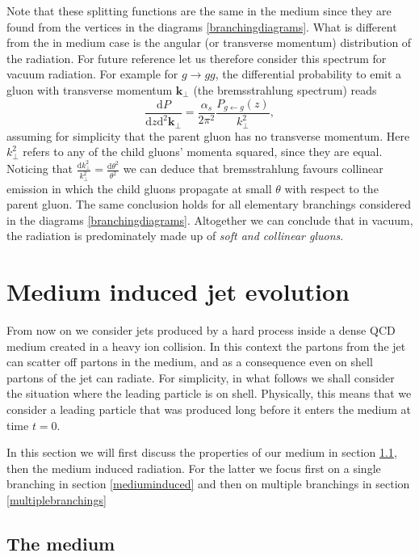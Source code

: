 \documentclass[a4paper,12pt]{article}
\numberwithin{equation}{section}
\begin{document}
Note that these splitting functions are the same in the medium since they are found from the vertices in the diagrams \eqref{branchingdiagrams}. What is different from the in medium case is the angular (or transverse momentum) distribution of the radiation. For future reference let us therefore consider this spectrum for vacuum radiation. For example for $g\rightarrow gg$, the differential probability to emit a gluon with transverse momentum $\mathbf{k}_\perp$ (the bremsstrahlung spectrum) reads\cite{peskin}
\begin{equation}
\frac{\mathrm{d}P}{\mathrm{d}z\mathrm{d}^2\mathbf{k}_\perp} =\frac{{\alpha_s}}{2\pi^2}\frac{P_{g\leftarrow g}(z)}{k_\perp^2},
\end{equation}
assuming for simplicity that the parent gluon has no transverse momentum. Here $k_\perp^2$ refers to any of the child gluons' momenta squared, since they are equal. Noticing that $\frac{\mathrm{d}k_\perp^2}{k_\perp^2} = \frac{\mathrm{d}\theta^2}{\theta^2}$ we can deduce that bremsstrahlung favours collinear emission in which the child gluons propagate at small $\theta$ with respect to the parent gluon. The same conclusion holds for all elementary branchings considered in the diagrams \eqref{branchingdiagrams}. Altogether we can conclude that in vacuum, the radiation is predominately made up of \emph{soft and collinear gluons}.


\section{Medium induced jet evolution}\label{medium}
From now on we consider jets produced by a hard process inside a dense QCD medium created in a heavy ion collision. In this context the partons from the jet can scatter off partons in the medium, and as a consequence even on shell partons of the jet can radiate. For simplicity, in what follows we shall consider the situation where the leading particle is on shell. Physically, this means that we consider a leading particle that was produced long before it enters the medium at time $t=0$. 

In this section we will first discuss the properties of our medium in section \ref{themedium}, then the medium induced radiation. For the latter we focus first on a single branching in section \ref{mediuminduced} and then on multiple branchings in section \ref{multiplebranchings}

\subsection{The medium}\label{themedium}
\end{document}
